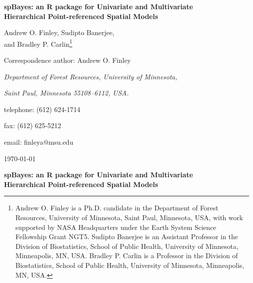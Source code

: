 \documentclass[a4paper]{article}
\let\proglang=\textsf
\newcommand{\pkg}[1]{{\normalfont\fontseries{b}\selectfont #1}}
\begin{document}
\thispagestyle{empty}
\setcounter{page}{0}

\begin{center}
{\Large {\bf  \pkg{spBayes}: an \proglang{R} package for Univariate and Multivariate }\\
\vspace{-.1in}
{\bf Hierarchical Point-referenced Spatial Models\\}}

\vspace{0.75in}
{\large {\sc Andrew O. Finley, Sudipto Banerjee,\\}
\vspace{-.1in}
{\sc and Bradley P. Carlin}}\footnote{Andrew O. Finley is a Ph.D. candidate in the Department of Forest Resources, University of Minnesota, Saint Paul, Minnesota, USA, with work supported by NASA Headquarters under the Earth System Science Fellowship Grant NGT5.  Sudipto Banerjee is an Assistant Professor in the Division of Biostatistics, School of Public Health, University of Minnesota, Minneapolis, MN, USA.  Bradley P. Carlin is a Professor in the Division of Biostatistics, School of Public Health, University of Minnesota, Minneapolis, MN, USA.}

\vspace{1.25in} Correspondence author:  Andrew O. Finley

\vspace{-.1in}
{\em Department of Forest Resources, University of Minnesota, \\}

\vspace{-.1in}

{\em Saint Paul, Minnesota 55108--6112, USA.}

\vspace{-.1in} telephone:  (612) 624-1714

\vspace{-.1in} fax: (612) 625-5212

\vspace{-.1in} email: finleya@msu.edu

\vspace{1in} \today
\end{center}


\newpage



\begin{center}
{\Large {\bf  \pkg{spBayes}: an \proglang{R} package for Univariate and Multivariate\\}
\vspace{-.1in}
{\bf Hierarchical Point-referenced Spatial Models\\}}
\end{center}
\end{document}
